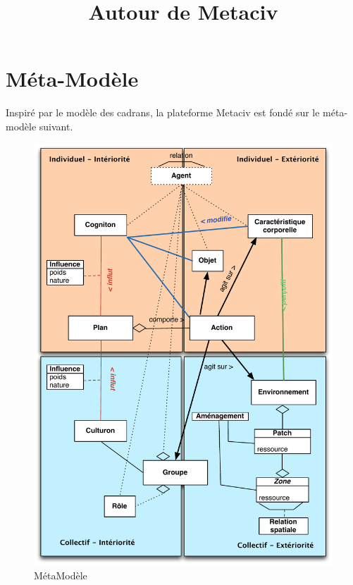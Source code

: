 \documentclass[a4paper,oneside,12 pt]{article}
\title{Autour de Metaciv}
\date{}
\begin{document}
\maketitle

\newpage
\section{Méta-Modèle}

Inspiré par le modèle des cadrans, la plateforme Metaciv est fondé sur le  méta-modèle suivant.
\begin{figure}[!h]
\begin{center}
\includegraphics[scale=0.6]{modele.pdf}
\caption[Modele]{MétaModèle \\}
\label{ex1}
\end{center}
\end{figure} 
\end{document}
